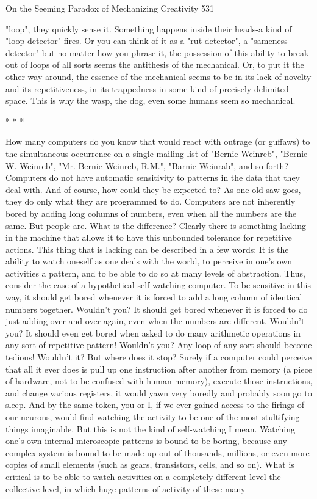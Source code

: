 On the Seeming Paradox of Mechanizing Creativity                                    531

"loop", they quickly sense it. Something happens inside their heads-a kind of "loop
detector" fires. Or you can think of it as a "rut detector", a "sameness detector"-but no
matter how you phrase it, the possession of this ability to break out of loops of all
sorts seems the antithesis of the mechanical. Or, to put it the other way around, the
essence of the mechanical seems to be in its lack of novelty and its repetitiveness, in
its trappedness in some kind of precisely delimited space. This is why the wasp, the
dog, even some humans seem so mechanical.

                                         *   *   *

        How many computers do you know that would react with outrage (or guffaws)
to the simultaneous occurrence on a single mailing list of "Bernie Weinreb", "Bernie
W. Weinreb", "Mr. Bernie Weinreb, R.M.", "Barnie Weinrab", and so forth?
Computers do not have automatic sensitivity to patterns in the data that they deal
with. And of course, how could they be expected to? As one old saw goes, they do
only what they are programmed to do. Computers are not inherently bored by adding
long columns of numbers, even when all the numbers are the same. But people are.
What is the difference?
        Clearly there is something lacking in the machine that allows it to have this
unbounded tolerance for repetitive actions. This thing that is lacking can be described
in a few words: It is the ability to watch oneself as one deals with the world, to
perceive in one's own activities a pattern, and to be able to do so at many levels of
abstraction. Thus, consider the case of a hypothetical self-watching computer. To be
sensitive in this way, it should get bored whenever it is forced to add a long column of
identical numbers together. Wouldn't you? It should get bored whenever it is forced to
do just adding over and over again, even when the numbers are different. Wouldn't
you? It should even get bored when asked to do many arithmetic operations in any
sort of repetitive pattern! Wouldn't you? Any loop of any sort should become tedious!
Wouldn't it?
        But where does it stop? Surely if a computer could perceive that all it ever
does is pull up one instruction after another from memory (a piece of hardware, not to
be confused with human memory), execute those instructions, and change various
registers, it would yawn very boredly and probably soon go to sleep. And by the same
token, you or I, if we ever gained access to the firings of our neurons, would find
watching the activity to be one of the most stultifying things imaginable.
        But this is not the kind of self-watching I mean. Watching one's own internal
microscopic patterns is bound to be boring, because any complex system is bound to
be made up out of thousands, millions, or even more copies of small elements (such
as gears, transistors, cells, and so on). What is critical is to be able to watch activities
on a completely different level the collective level, in which huge patterns of activity
of these many




